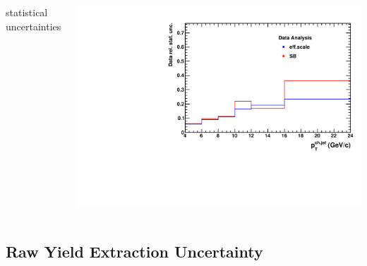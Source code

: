 \documentclass[xcolor={usenames,dvipsnames}]{beamer}
\begin{document}
\begin{frame}
\begin{columns}[c]
\column{5.5cm} 
\footnotesize{statistical uncertainties}
\begin{minipage}{1.\linewidth}
\includegraphics[width=0.95\linewidth]{img/rawYieldpPb/DataStatUnc.pdf}
\end{minipage}
	
\end{columns}
\end{frame}

\subsection{Raw Yield Extraction Uncertainty}
\end{document}
